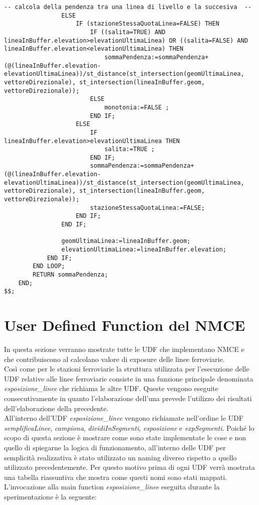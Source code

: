 \begin{lstlisting}[style=mySQL]
				-- calcola della pendenza tra una linea di livello e la succesiva  --
				ELSE
					IF (stazioneStessaQuotaLinea=FALSE) THEN
						IF ((salita=TRUE) AND lineaInBuffer.elevation>elevationUltimaLinea) OR ((salita=FALSE) AND lineaInBuffer.elevation<elevationUltimaLinea) THEN
							sommaPendenza:=sommaPendenza+(@(lineaInBuffer.elevation-elevationUltimaLinea))/st_distance(st_intersection(geomUltimaLinea, vettoreDirezionale), st_intersection(lineaInBuffer.geom, vettoreDirezionale));
						ELSE
							monotonia:=FALSE ;
						END IF;
					ELSE
						IF lineaInBuffer.elevation>elevationUltimaLinea THEN
							salita:=TRUE ;
						END IF;
						sommaPendenza:=sommaPendenza+(@(lineaInBuffer.elevation-elevationUltimaLinea))/st_distance(st_intersection(geomUltimaLinea, vettoreDirezionale), st_intersection(lineaInBuffer.geom, vettoreDirezionale));
						stazioneStessaQuotaLinea:=FALSE;
					END IF;
				END IF;

				geomUltimaLinea:=lineaInBuffer.geom;
				elevationUltimaLinea:=lineaInBuffer.elevation;
			END IF;
		END LOOP;
		RETURN sommaPendenza;
	END;
$$;
\end{lstlisting}


\section{User Defined Function del NMCE}
\label{udfnmce}
In questa sezione verranno mostrate tutte le UDF che implementano NMCE e che contribuiscono al calcolano valore di exposure delle linee ferroviarie.\\ 
Così come per le stazioni ferroviarie la struttura utilizzata per l'esecuzione delle UDF relative alle linee ferroviarie consiste in una funzione principale denominata \textit{esposizione\_linee} che richiama le altre UDF.
Queste vengono eseguite consecutivamente in quanto l'elaborazione dell'una prevede l'utilizzo dei risultati dell'elaborazione della precedente. \\
All'interno dell'UDF \textit{esposizione\_linee} vengono richiamate nell'ordine le UDF \textit{semplificaLinee}, \textit{campiona}, \textit{dividiInSegmenti}, \textit{esposizione} e \textit{expSegmenti}.
Poiché lo scopo di questa sezione è mostrare come sono state implementate le cose e non quello di spiegarne la logica di funzionamento, all'interno delle UDF per semplicità realizzativa è stato utilizzato un naming diverso rispetto a quello utilizzato precedentemente. Per questo motivo prima di ogni UDF verrà mostrata una tabella riassuntiva che mostra come questi nomi sono stati mappati. 
L'invocazione alla main function \textit{esposizione\_linee} eseguita durante la sperimentazione è la seguente:

